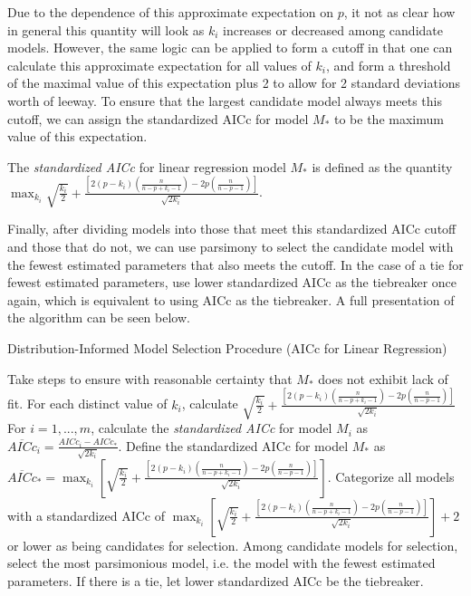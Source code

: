 		Due to the dependence of this approximate expectation on $p$, it not as clear how in general this quantity will look as $k_i$ increases
		or decreased among candidate models. However, the same logic can be applied to form a cutoff in that one can calculate this approximate
		expectation for all values of $k_i$, and form a threshold of the maximal value of this expectation plus 2 to allow for 2 standard deviations
		worth of leeway. To ensure that the largest candidate model always meets this cutoff, we can assign the standardized AICc for model $M_*$
		to be the maximum value of this expectation.
		\begin{definition}
			The \textit{standardized AICc} for linear regression model $M_*$ is defined as the quantity
			$\max_{k_i} \sqrt{\frac{k_i}{2}} + \frac{\left[ 2(p-k_i) \left( \frac{n}{n-p+k_i-1} \right) - 2p \left( \frac{n}{n-p-1} \right) \right]}{\sqrt{2k_i}}$.
		\end{definition}

		Finally, after dividing models into those that meet this standardized AICc cutoff and those that do not, we can use parsimony to select
		the candidate model with the fewest estimated parameters that also meets the cutoff. In the case of a tie for fewest estimated parameters,
		use lower standardized AICc as the tiebreaker once again, which is equivalent to using AICc as the tiebreaker. A full presentation of
		the algorithm can be seen below.

		\begin{algorithm}[H]
			\caption{Distribution-Informed Model Selection Procedure (AICc for Linear Regression)}
			\begin{algorithmic}[1]
			  \State Take steps to ensure with reasonable certainty that $M_*$ does not exhibit lack of fit.
			  \State For each distinct value of $k_i$, calculate $\sqrt{\frac{k_i}{2}} + \frac{\left[ 2(p-k_i) \left( \frac{n}{n-p+k_i-1} \right) - 2p \left( \frac{n}{n-p-1} \right) \right]}{\sqrt{2k_i}}$
			  \State For $i = 1,...,m$, calculate the \textit{standardized AICc} for model $M_i$ as 
			  $\overline{AICc}_i = \frac{AICc_i - AICc_*}{\sqrt{2k_i}}$. Define the standardized AICc for model
			  $M_*$ as $\overline{AICc}_* = \max_{k_i} \left[ \sqrt{\frac{k_i}{2}} + \frac{\left[ 2(p-k_i) \left( \frac{n}{n-p+k_i-1} \right) - 2p \left( \frac{n}{n-p-1} \right) \right]}{\sqrt{2k_i}} \right]$.
			  \State Categorize all models with a standardized AICc of
			  $ \max_{k_i} \left[ \sqrt{\frac{k_i}{2}} + \frac{\left[ 2(p-k_i) \left( \frac{n}{n-p+k_i-1} \right) - 2p \left( \frac{n}{n-p-1} \right) \right]}{\sqrt{2k_i}} \right] + 2$
			  or lower as being candidates for selection.
			  \State Among candidate models for selection, select the most parsimonious model, i.e. the model
			  with the fewest estimated parameters. If there is a tie, let lower standardized AICc be the
			  tiebreaker.
			\end{algorithmic}
		\end{algorithm}

